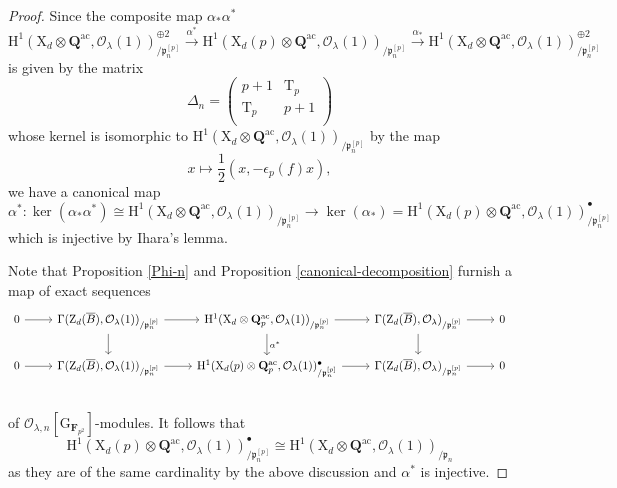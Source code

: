\documentclass[10pt,a4paper]{amsart}
\def\FF{\mathbf{F}}
\def\QQ{\mathbf{Q}}
\def\Qbar{\QQ^{\ac}}
\def\ac{\mathrm{ac}}
\def\calO{\mathcal{O}}
\def\frakp{\mathfrak{p}}
\def\rmG{\mathrm{G}}
\def\rmH{\mathrm{H}}
\def\rmT{\mathrm{T}}
\def\rmX{\mathrm{X}}
\def\rmZ{\mathrm{Z}}
\begin{document}
\begin{proof}
Since the composite map $\alpha_{\ast}\alpha^{\ast}$
\begin{equation*}
\rmH^{1}({\rmX}_{d}\otimes{\Qbar}, \calO_{\lambda}(1))^{\oplus2}_{/\frakp^{[p]}_{n}}\xrightarrow{\alpha^{\ast}} \rmH^{1}(\rmX_{d}(p)\otimes{\Qbar}, \calO_{\lambda}(1))_{/\frakp^{[p]}_{n}}\xrightarrow{\alpha_{\ast}} \rmH^{1}({\rmX}_{d}\otimes{\Qbar}, \calO_{\lambda}(1))^{\oplus2}_{/\frakp^{[p]}_{n}}
\end{equation*}
is given by the matrix 
\begin{equation*}
\Delta_{n}=
\begin{pmatrix}
p+1 &   \rmT_{p}\\
\rmT_{p} & p+1\\ 
\end{pmatrix}
\end{equation*}
whose kernel is isomorphic to $\rmH^{1}({\rmX}_{d}\otimes{\Qbar}, \calO_{\lambda}(1))_{/\frakp^{[p]}_{n}}$ by the map 
\begin{equation}\label{1/2}
x\mapsto \frac{1}{2}(x, -\epsilon_{p}(f)x), 
\end{equation}
we have a canonical map 
\begin{equation*}
\alpha^{\ast}: \ker(\alpha_{\ast}\alpha^{\ast})\cong\rmH^{1}({\rmX}_{d}\otimes{\Qbar}, \calO_{\lambda}(1))_{/\frakp^{[p]}_{n}} \rightarrow \ker(\alpha_{\ast})=\rmH^{1}(\rmX_{d}(p)\otimes{\Qbar}, \calO_{\lambda}(1))^{\bullet}_{/\frakp^{[p]}_{n}} 
\end{equation*}
which is injective by Ihara's lemma. 

Note that Proposition \ref{Phi-n} and Proposition \ref{canonical-decomposition} furnish a map of exact sequences
\begin{equation*}
\begin{tikzcd}
0 \arrow[r] &\Gamma(\rmZ_{d}(\overline{B}), \calO_{\lambda}(1))_{/\frakp^{[p]}_{n}} \arrow[r] \arrow[d]      & \rmH^{1}({\rmX}_{d}\otimes{\QQ^{\ac}_{p}}, \calO_{\lambda}(1))_{/\frakp^{[p]}_{n}} \arrow[r] \arrow[d, "\alpha^{\ast}"] & \Gamma(\rmZ_{d}(\overline{B}), \calO_{\lambda})_{/\frakp^{[p]}_{n}} \arrow[d] \arrow[r] & 0\\
0 \arrow[r] &\Gamma(\rmZ_{d}(\overline{B}), \calO_{\lambda}(1))_{/\frakp^{[p]}_{n}} \arrow[r] &\rmH^{1}({\rmX}_{d}(p)\otimes {\QQ^{\ac}_{p}}, \calO_{\lambda}(1))^{\bullet}_{/\frakp^{[p]}_{n}}\arrow[r] & \Gamma(\rmZ_{d}(\overline{B}), \calO_{\lambda})_{/\frakp^{[p]}_{n}}\arrow[r] & 0\\  
\end{tikzcd}
\end{equation*}
of $\calO_{\lambda,n}[\rmG_{\FF_{p^{2}}}]$-modules. It follows that 
\begin{equation*}
\rmH^{1}(\rmX_{d}(p)\otimes{\Qbar}, \calO_{\lambda}(1))^{\bullet}_{/\frakp^{[p]}_{n}}\cong \rmH^{1}(\rmX_{d}\otimes{\Qbar}, \calO_{\lambda}(1))_{/\frakp_{n}}
\end{equation*}
as they are of the same cardinality by the above discussion and $\alpha^{\ast}$ is injective.
\end{proof}
\end{document}
